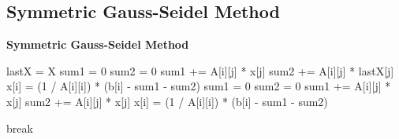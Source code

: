\documentclass{article}
\begin{document}
\subsection{Symmetric Gauss-Seidel Method}
\begin{algorithm}[H]
    \caption{\textbf{Symmetric Gauss-Seidel Method}}
    \label{algo:sgs}
    \begin{algorithmic}
            \State lastX = X
                \State sum1 = 0
                \State sum2 = 0
                    \State sum1 += A[i][j] * x[j]
                \EndFor
                    \State sum2 += A[i][j] * lastX[j]
                \EndFor
                \State x[i] = (1 / A[i][i]) * (b[i] - sum1 - sum2)
            \EndFor
                \State sum1 = 0
                \State sum2 = 0
                    \State sum1 += A[i][j] * x[j]
                \EndFor
                    \State sum2 += A[i][j] * x[j]
                \EndFor
                \State x[i] = (1 / A[i][i]) * (b[i] - sum1 - sum2)
            \EndFor

                \State break
            \EndIf
        \EndFor
    \end{algorithmic}
\end{algorithm}
\end{document}

